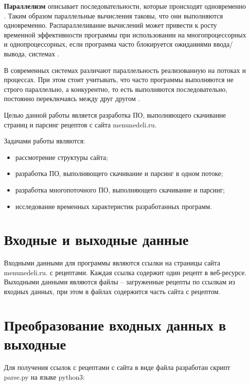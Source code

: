 
\textbf{Параллелизм} описывает последовательности, которые происходят одновременно \cite{posix-threads}. Таким образом параллельные вычисления таковы, что они выполняются одновременно. Распараллеливание вычислений может привести к росту временной эффективности программы при использовании на многопроцессорных и однопроцессорных, если программа часто блокируется ожиданиями ввода/вывода, системах \cite{tanenbaum}.

В современных системах различают параллельность реализованную на потоках и процессах. При этом стоит учитывать, что часто программы выполняются не строго параллельно, а конкурентно, то есть выполняются последовательно, постоянно переключаясь между друг другом \cite{tanenbaum}.

Целью данной работы является разработка ПО, выполняющего скачивание страниц и парсинг рецептов с сайта menunedeli.ru.

Задачами работы являются:

\begin{itemize}
	\item рассмотрение структуры сайта;
	\item разработка ПО, выполняющего скачивание и парсинг в одном потоке;
	\item разработка многопоточного ПО, выполняющего скачивание и парсинг;
	\item исследование временных характеристик разработанных программ.
\end{itemize}
\vspace{20mm}
{\let\clearpage\relax \chapter{Входные и выходные данные}}
Входными данными для программы являются ссылки на страницы сайта menunedeli.ru. с рецептами. Каждая ссылка содержит один рецепт в веб-ресурсе. Выходными данными являются файлы -- загруженные рецепты по ссылкам из входных данных, при этом в файлах содержится часть сайта с рецептом.

\vspace{20mm}
{\let\clearpage\relax \chapter{Преобразование входных данных в выходные}}

Для получения ссылок с рецептами с сайта в виде файла разработан скрипт parse.py на языке python3:

